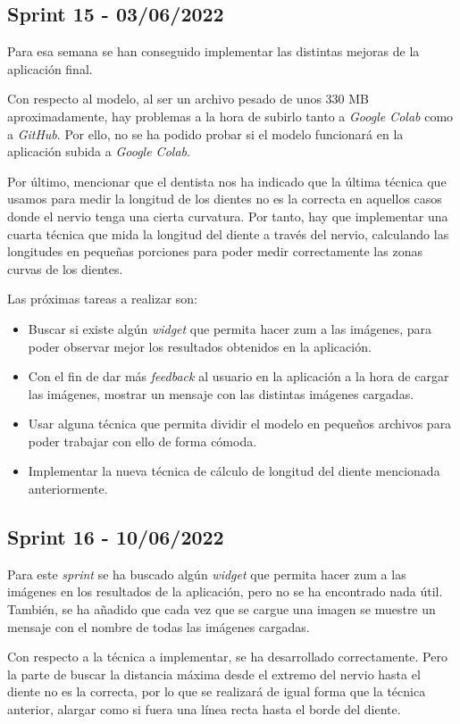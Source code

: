 \subsection{Sprint 15 - 03/06/2022}
Para esa semana se han conseguido implementar las distintas mejoras de la aplicación final. 

Con respecto al modelo, al ser un archivo pesado de unos 330 MB aproximadamente, hay problemas a la hora de subirlo tanto a \emph{Google Colab} como a \emph{GitHub}. Por ello, no se ha podido probar si el modelo funcionará en la aplicación subida a \emph{Google Colab}.

Por último, mencionar que el dentista nos ha indicado que la última técnica que usamos para medir la longitud de los dientes no es la correcta en aquellos casos donde el nervio tenga una cierta curvatura. Por tanto, hay que implementar una cuarta técnica que mida la longitud del diente a través del nervio, calculando las longitudes en pequeñas porciones para poder medir correctamente las zonas curvas de los dientes.

Las próximas tareas a realizar son:
\begin{itemize}
    \item Buscar si existe algún \emph{widget} que permita hacer zum a las imágenes, para poder observar mejor los resultados obtenidos en la aplicación.
    \item Con el fin de dar más \emph{feedback} al usuario en la aplicación a la hora de cargar las imágenes, mostrar un mensaje con las distintas imágenes cargadas.
    \item Usar alguna técnica que permita dividir el modelo en pequeños archivos para poder trabajar con ello de forma cómoda.
    \item Implementar la nueva técnica de cálculo de longitud del diente mencionada anteriormente.
\end{itemize}

\subsection{Sprint 16 - 10/06/2022}
Para este \emph{sprint} se ha buscado algún \emph{widget} que permita hacer zum a las imágenes en los resultados de la aplicación, pero no se ha encontrado nada útil. También, se ha añadido que cada vez que se cargue una imagen se muestre un mensaje con el nombre de todas las imágenes cargadas.

Con respecto a la técnica a implementar, se ha desarrollado correctamente. Pero la parte de buscar la distancia máxima desde el extremo del nervio hasta el diente no es la correcta, por lo que se realizará de igual forma que la técnica anterior, alargar como si fuera una línea recta hasta el borde del diente.


